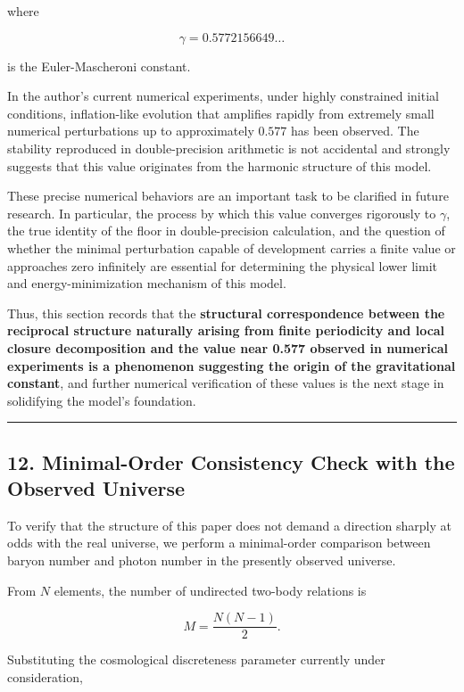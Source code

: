 \documentclass[
  a4paper,
]{article}
\begin{document}
where

\[
\gamma
=
0.5772156649\ldots
\]

is the Euler-Mascheroni constant.

In the author's current numerical experiments, under highly constrained
initial conditions, inflation-like evolution that amplifies rapidly from
extremely small numerical perturbations up to approximately \(0.577\)
has been observed. The stability reproduced in double-precision
arithmetic is not accidental and strongly suggests that this value
originates from the harmonic structure of this model.

These precise numerical behaviors are an important task to be clarified
in future research. In particular, the process by which this value
converges rigorously to \(\gamma\), the true identity of the floor in
double-precision calculation, and the question of whether the minimal
perturbation capable of development carries a finite value or approaches
zero infinitely are essential for determining the physical lower limit
and energy-minimization mechanism of this model.

Thus, this section records that the \textbf{structural correspondence
between the reciprocal structure naturally arising from finite
periodicity and local closure decomposition and the value near 0.577
observed in numerical experiments is a phenomenon suggesting the origin
of the gravitational constant}, and further numerical verification of
these values is the next stage in solidifying the model's foundation.

\begin{center}\rule{0.5\linewidth}{0.5pt}\end{center}

\subsection{12. Minimal-Order Consistency Check with the Observed
Universe}\label{minimal-order-consistency-check-with-the-observed-universe}

To verify that the structure of this paper does not demand a direction
sharply at odds with the real universe, we perform a minimal-order
comparison between baryon number and photon number in the presently
observed universe.

From \(N\) elements, the number of undirected two-body relations is

\[
M
=
\frac{N(N-1)}{2}.
\tag{19}
\]

Substituting the cosmological discreteness parameter currently under
consideration,
\end{document}
